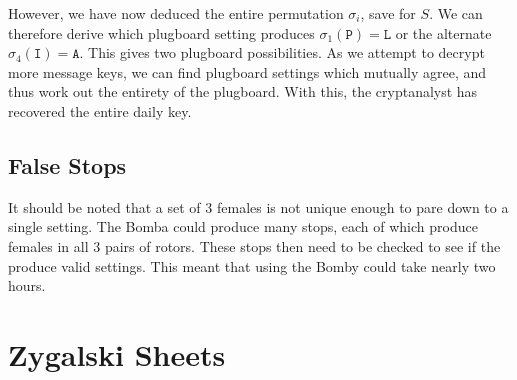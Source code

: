 \noindent However, we have now deduced the entire permutation
$\sigma_i$, save for $S$. We can therefore derive which plugboard
setting produces $\sigma_1(\texttt{P}) = \texttt{L}$ or the
alternate $\sigma_4(\texttt{I}) = \texttt{A}$. This gives two
plugboard possibilities. As we attempt to decrypt more message keys,
we can find plugboard settings which mutually agree, and thus work out the
entirety of the plugboard. With this, the cryptanalyst has recovered
the entire daily key.
\subsection{False Stops}
It should be noted that a set of $3$ females is not unique enough to
pare down to a single setting. The Bomba could produce many stops,
each of which produce females in all $3$ pairs of rotors. These stops
then need to be checked to see if the produce valid settings. This
meant that using the Bomby could take nearly two hours.

\section{Zygalski Sheets}\label{zygalski}

